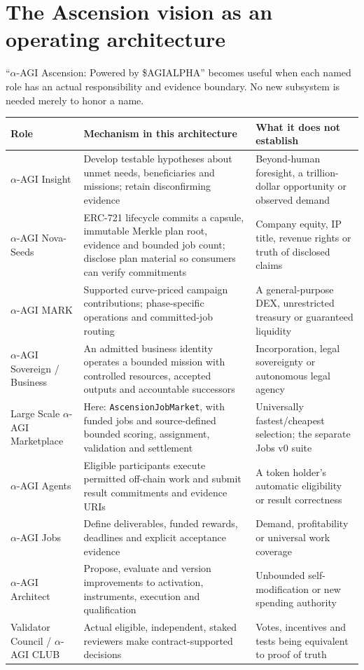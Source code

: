 \documentclass[11pt,letterpaper]{article}
\newcommand{\AGI}{\$AGIALPHA}
\begin{document}
\FloatBarrier
\section{The Ascension vision as an operating architecture}
``$\alpha$-AGI Ascension: Powered by \AGI'' becomes useful when each named role has an actual responsibility and evidence boundary. No new subsystem is needed merely to honor a name.

\begin{longtable}{@{}P{3.05cm}P{6.3cm}P{5.1cm}@{}}\toprule
Role & Mechanism in this architecture & What it does not establish\\\midrule\endhead
$\alpha$-AGI Insight & Develop testable hypotheses about unmet needs, beneficiaries and missions; retain disconfirming evidence & Beyond-human foresight, a trillion-dollar opportunity or observed demand\\
$\alpha$-AGI Nova-Seeds & ERC-721 lifecycle commits a capsule, immutable Merkle plan root, evidence and bounded job count; disclose plan material so consumers can verify commitments & Company equity, IP title, revenue rights or truth of disclosed claims\\
$\alpha$-AGI MARK & Supported curve-priced campaign contributions; phase-specific operations and committed-job routing & A general-purpose DEX, unrestricted treasury or guaranteed liquidity\\
$\alpha$-AGI Sovereign / Business & An admitted business identity operates a bounded mission with controlled resources, accepted outputs and accountable successors & Incorporation, legal sovereignty or autonomous legal agency\\
Large Scale $\alpha$-AGI Marketplace & Here: \texttt{AscensionJobMarket}, with funded jobs and source-defined bounded scoring, assignment, validation and settlement & Universally fastest/cheapest selection; the separate Jobs v0 suite\\
$\alpha$-AGI Agents & Eligible participants execute permitted off-chain work and submit result commitments and evidence URIs & A token holder's automatic eligibility or result correctness\\
$\alpha$-AGI Jobs & Define deliverables, funded rewards, deadlines and explicit acceptance evidence & Demand, profitability or universal work coverage\\
$\alpha$-AGI Architect & Propose, evaluate and version improvements to activation, instruments, execution and qualification & Unbounded self-modification or new spending authority\\
Validator Council / $\alpha$-AGI CLUB & Actual eligible, independent, staked reviewers make contract-supported decisions & Votes, incentives and tests being equivalent to proof of truth\\\bottomrule
\end{longtable}
\end{document}
